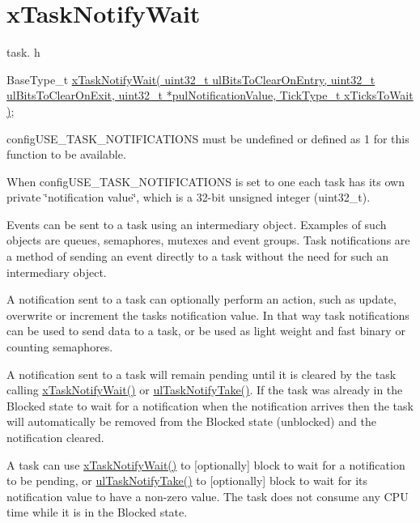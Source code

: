 \hypertarget{group__x_task_notify_wait}{}\section{x\+Task\+Notify\+Wait}
\label{group__x_task_notify_wait}
task. h 
\begin{DoxyPre}BaseType\_t \hyperlink{task_8h_a0475fcda9718f403521c270a7270ff93}{xTaskNotifyWait( uint32\_t ulBitsToClearOnEntry, uint32\_t ulBitsToClearOnExit, uint32\_t *pulNotificationValue, TickType\_t xTicksToWait )};\end{DoxyPre}


config\+U\+S\+E\+\_\+\+T\+A\+S\+K\+\_\+\+N\+O\+T\+I\+F\+I\+C\+A\+T\+I\+O\+NS must be undefined or defined as 1 for this function to be available.

When config\+U\+S\+E\+\_\+\+T\+A\+S\+K\+\_\+\+N\+O\+T\+I\+F\+I\+C\+A\+T\+I\+O\+NS is set to one each task has its own private \char`\"{}notification value\char`\"{}, which is a 32-\/bit unsigned integer (uint32\+\_\+t).

Events can be sent to a task using an intermediary object. Examples of such objects are queues, semaphores, mutexes and event groups. Task notifications are a method of sending an event directly to a task without the need for such an intermediary object.

A notification sent to a task can optionally perform an action, such as update, overwrite or increment the task\textquotesingle{}s notification value. In that way task notifications can be used to send data to a task, or be used as light weight and fast binary or counting semaphores.

A notification sent to a task will remain pending until it is cleared by the task calling \hyperlink{task_8h_a0475fcda9718f403521c270a7270ff93}{x\+Task\+Notify\+Wait()} or \hyperlink{task_8h_a66540bef602522a01a519f776e4c07d8}{ul\+Task\+Notify\+Take()}. If the task was already in the Blocked state to wait for a notification when the notification arrives then the task will automatically be removed from the Blocked state (unblocked) and the notification cleared.

A task can use \hyperlink{task_8h_a0475fcda9718f403521c270a7270ff93}{x\+Task\+Notify\+Wait()} to \mbox{[}optionally\mbox{]} block to wait for a notification to be pending, or \hyperlink{task_8h_a66540bef602522a01a519f776e4c07d8}{ul\+Task\+Notify\+Take()} to \mbox{[}optionally\mbox{]} block to wait for its notification value to have a non-\/zero value. The task does not consume any C\+PU time while it is in the Blocked state.

